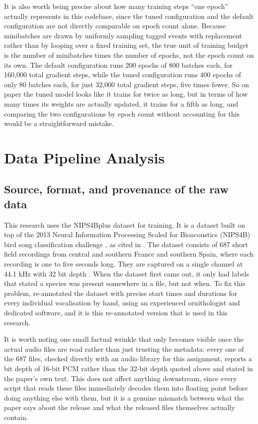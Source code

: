 \documentclass[11pt]{article}
\begin{document}
It is also worth being precise about how many training steps ``one epoch'' actually represents in this codebase, since the tuned configuration and the default configuration are not directly comparable on epoch count alone. Because minibatches are drawn by uniformly sampling tagged events with replacement rather than by looping over a fixed training set, the true unit of training budget is the number of minibatches times the number of epochs, not the epoch count on its own. The default configuration runs 200 epochs of 800 batches each, for 160{,}000 total gradient steps, while the tuned configuration runs 400 epochs of only 80 batches each, for just 32{,}000 total gradient steps, five times fewer. So on paper the tuned model looks like it trains for twice as long, but in terms of how many times its weights are actually updated, it trains for a fifth as long, and comparing the two configurations by epoch count without accounting for this would be a straightforward mistake.

\section{Data Pipeline Analysis}

\subsection{Source, format, and provenance of the raw data}

This research uses the NIPS4Bplus dataset for training. It is a dataset built on top of the 2013 Neural Information Processing Scaled for Bioacoustics (NIPS4B) bird song classification challenge \cite{glotin2013}, as cited in \cite{bravosanchez2021}. The dataset consists of 687 short field recordings from central and southern France and southern Spain, where each recording is one to five seconds long. They are captured on a single channel at 44.1 kHz with 32 bit depth \cite{bravosanchez2021}. When the dataset first came out, it only had labels that stated a species was present somewhere in a file, but not when. To fix this problem, \citet{morfi2019} re-annotated the dataset with precise start times and durations for every individual vocalisation by hand, using an experienced ornithologist and dedicated software, and it is this re-annotated version that is used in this research.

It is worth noting one small factual wrinkle that only becomes visible once the actual audio files are read rather than just trusting the metadata: every one of the 687 files, checked directly with an audio library for this assignment, reports a bit depth of 16-bit PCM rather than the 32-bit depth quoted above and stated in the paper's own text. This does not affect anything downstream, since every script that reads these files immediately decodes them into floating point before doing anything else with them, but it is a genuine mismatch between what the paper says about the release and what the released files themselves actually contain.
\end{document}
